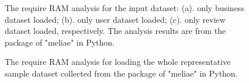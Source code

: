 \begin{itemize}
\begin{figure}[h] 
	\begin{center}
		\advance\rightskip-1cm
		{}
		\caption{The require RAM analysis for the input dataset: (a). only business dataset loaded; (b). only user dataset loaded; (c). only review dataset loaded, respectively. The analysis results are from the package of "meliae" in Python.}\label{fig:RAM}
	\end{center}
\end{figure}

\begin{figure}[h] 
	\begin{center}
		\advance\rightskip-1cm
		{}
		\caption{The require RAM analysis for loading the whole representative sample dataset collected from the package of "meliae" in Python.}\label{fig:RAM_total}
	\end{center}
\end{figure}


\end{itemize}
